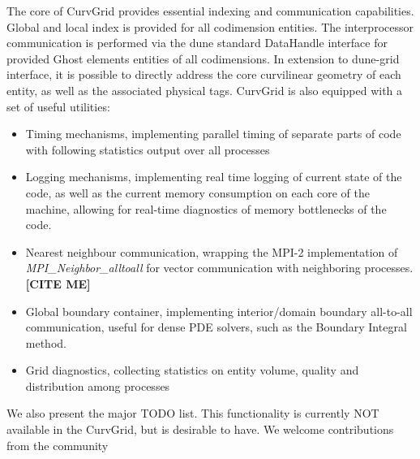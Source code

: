 \noindent
The core of CurvGrid provides essential indexing and communication capabilities. Global and local index is provided for all codimension entities. The interprocessor communication is performed via the dune standard DataHandle interface for provided Ghost elements entities of all codimensions. In extension to dune-grid interface, it is possible to directly address the core curvilinear geometry of each entity, as well as the associated physical tags. CurvGrid is also equipped with a set of useful utilities:
\begin{itemize}
    \item Timing mechanisms, implementing parallel timing of separate parts of code with following statistics output over all processes
    \item Logging mechanisms, implementing real time logging of current state of the code, as well as the current memory consumption on each core of the machine, allowing for real-time diagnostics of memory bottlenecks of the code.
    \item Nearest neighbour communication, wrapping the MPI-2 implementation of \textit{MPI\_Neighbor\_alltoall} for vector communication with neighboring processes. \textbf{[CITE ME]}
    \item Global boundary container, implementing interior/domain boundary all-to-all communication, useful for dense PDE solvers, such as the Boundary Integral method. \cite{kern+2009}
    \item Grid diagnostics, collecting statistics on entity volume, quality and distribution among processes
\end{itemize}

\noindent
We also present the major TODO list. This functionality is currently NOT available in the CurvGrid, but is desirable to have. We welcome contributions from the community \\

